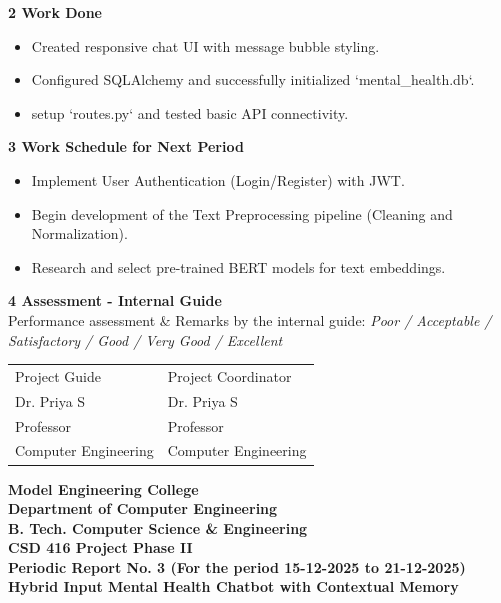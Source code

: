 \documentclass[12pt,a4paper]{article}
\begin{document}
\noindent\textbf{2 \quad Work Done}
\begin{itemize}
    \item Created responsive chat UI with message bubble styling.
    \item Configured SQLAlchemy and successfully initialized `mental_health.db`.
    \item setup `routes.py` and tested basic API connectivity.
\end{itemize}

\noindent\textbf{3 \quad Work Schedule for Next Period}
\begin{itemize}
    \item Implement User Authentication (Login/Register) with JWT.
    \item Begin development of the Text Preprocessing pipeline (Cleaning and Normalization).
    \item Research and select pre-trained BERT models for text embeddings.
\end{itemize}


\noindent\textbf{4 \quad Assessment - Internal Guide}\\[0.5em]
Performance assessment \& Remarks by the internal guide: \textit{Poor / Acceptable /}\\
\textit{Satisfactory / Good / Very Good / Excellent}\\[3em]

\noindent
\begin{tabular}{p{} p{}}
Project Guide & Project Coordinator\\[0.5em]
Dr. Priya S & Dr. Priya S\\
Professor & Professor\\
Computer Engineering & Computer Engineering\\
\end{tabular}

\vfill
\newpage


\begin{center}
{\Large \textbf{Model Engineering College}}\\[0.2em]
{\large \textbf{Department of Computer Engineering}}\\[0.2em]
{\large \textbf{B. Tech. Computer Science \& Engineering}}\\[0.2em]
{\large \textbf{CSD 416 Project Phase II}}\\[1em]
{\large \textbf{Periodic Report No. 3 (For the period 15-12-2025 to 21-12-2025)}}\\[1.5em]

{\Large \textbf{Hybrid Input Mental Health Chatbot with Contextual Memory}}\\[0.2em]

\end{center}
\end{document}
